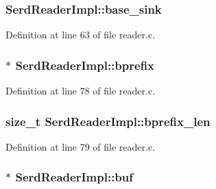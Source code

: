 \subsubsection[{\texorpdfstring{base\+\_\+sink}{base_sink}}]{ Serd\+Reader\+Impl\+::base\+\_\+sink}\hypertarget{struct_serd_reader_impl_af5714ae0f9634efefffe98c4f3bb71bb}{}\label{struct_serd_reader_impl_af5714ae0f9634efefffe98c4f3bb71bb}


Definition at line 63 of file reader.\+c.

\subsubsection[{\texorpdfstring{bprefix}{bprefix}}]{$\ast$ Serd\+Reader\+Impl\+::bprefix}\hypertarget{struct_serd_reader_impl_af61d5a94d087d60988a6ea9b9f63ab2b}{}\label{struct_serd_reader_impl_af61d5a94d087d60988a6ea9b9f63ab2b}


Definition at line 78 of file reader.\+c.

\subsubsection[{\texorpdfstring{bprefix\+\_\+len}{bprefix_len}}]{\setlength{\rightskip}{0pt plus 5cm}size\+\_\+t Serd\+Reader\+Impl\+::bprefix\+\_\+len}\hypertarget{struct_serd_reader_impl_a5a75eaed54d5b72afd6904b54d06e6be}{}\label{struct_serd_reader_impl_a5a75eaed54d5b72afd6904b54d06e6be}


Definition at line 79 of file reader.\+c.

\subsubsection[{\texorpdfstring{buf}{buf}}]{$\ast$ Serd\+Reader\+Impl\+::buf}\hypertarget{struct_serd_reader_impl_aca4db00f91fdf36b05ec228b9d44f112}{}\label{struct_serd_reader_impl_aca4db00f91fdf36b05ec228b9d44f112}


